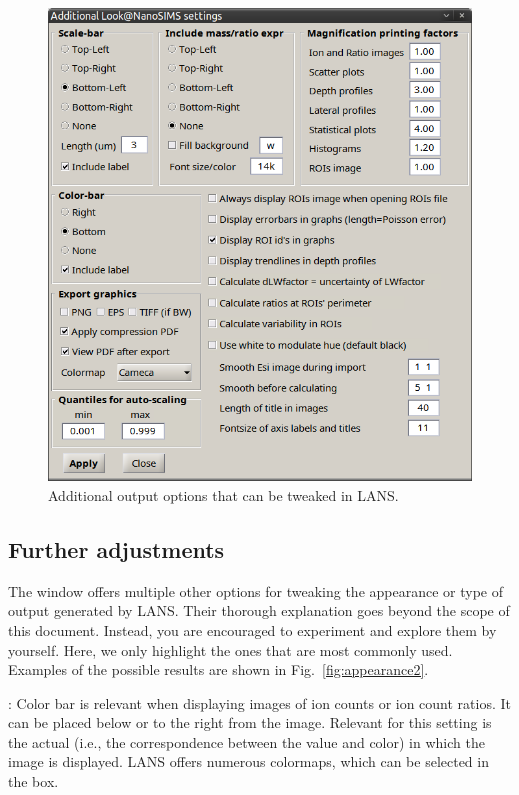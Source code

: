 \begin{figure}[!t]
\centering
\includegraphics[scale=0.35]{figs1/LANS-tweaking}
\caption{\label{fig:appearance}%
Additional output options that can be tweaked in LANS.}
\end{figure}

\subsection{Further adjustments}
\label{sec:appearance1}

\goldbox{}
The  window offers multiple other options for tweaking the appearance or type of output generated by LANS. Their thorough explanation goes beyond the scope of this document. Instead, you are encouraged to experiment and explore them by yourself. Here, we only highlight the ones that are most commonly used. Examples of the possible results are shown in Fig.~\ref{fig:appearance2}.
\tcbe

\bul {}: Color bar is relevant when displaying images of ion counts or ion count ratios. It can be placed below or to the right from the image. Relevant for this setting is the actual  (i.e., the correspondence between the value and color) in which the image is displayed. LANS offers numerous colormaps, which can be selected in the  box.

